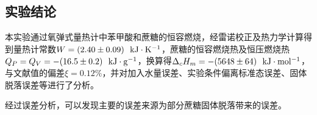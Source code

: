 \documentclass[12pt]{article}
\begin{document}
 		



 	 \subsection{实验结论}
 	 本实验通过氧弹式量热计中苯甲酸和蔗糖的恒容燃烧，经雷诺校正及热力学计算得到量热计常数$W=(2.40\pm 0.09)\ \ {\rm kJ\cdot K^{-1}}$，蔗糖的恒容燃烧热及恒压燃烧热$Q_{P}=Q_{V}=-(16.5\pm 0.2)\ \ {\rm kJ\cdot g^{-1}}$，换算得$\Delta_{c}H_{m}=-(5648\pm 64)\ \ {\rm kJ\cdot mol^{-1}}$，与文献值的偏差$\xi=0.12\%$，并对加入水量误差、实验条件偏离标准态误差、固体脱落误差等进行了分析。\par 
 	 经过误差分析，可以发现主要的误差来源为部分蔗糖固体脱落带来的误差。


 

   

\vbox{}



\end{document}
